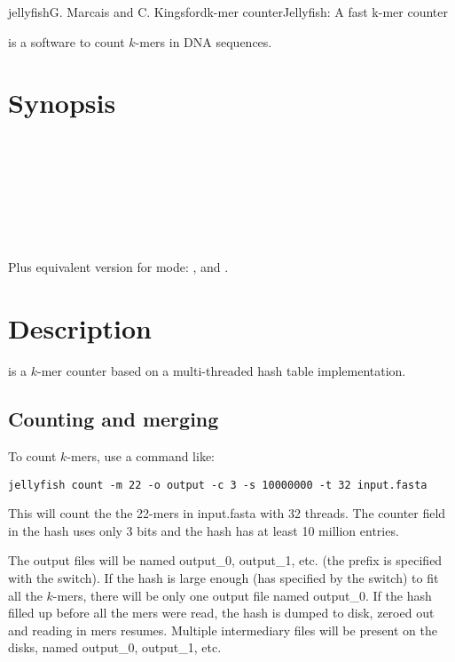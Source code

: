 \documentclass[english]{article}
\newcommand{\ddash}[1]{-\,-#1}
\newcommand{\LoOpt}[1]{\oOpt{\ddash{#1}}}
\begin{document}
\begin{Name}{1}{jellyfish}{G. Marcais and C. Kingsford}{k-mer counter}{Jellyfish: A fast k-mer counter}

 is a software to count $k$-mers in DNA sequences.

\end{Name}

\section{Synopsis}
     \LoOpt{both-strands}   \\
   \Dots \\
   \\
  \\
     \\
  \\
 \\


Plus equivalent version for  mode: ,  and .

\section{Description}

 is a $k$-mer counter based on a multi-threaded hash
table implementation.

\subsection{Counting and merging}

To count $k$-mers, use a command like:

\begin{verbatim}
jellyfish count -m 22 -o output -c 3 -s 10000000 -t 32 input.fasta
\end{verbatim}

This will count the the 22-mers in input.fasta with 32 threads. The
counter field in the hash uses only 3 bits and the hash has at least
10 million entries.

The output files will be named output\_0, output\_1, etc. (the prefix
is specified with the  switch). If the hash is large enough
(has specified by the  switch) to fit all the $k$-mers, there
will be only one output file named output\_0. If the hash filled up
before all the mers were read, the hash is dumped to disk, zeroed out
and reading in mers resumes. Multiple intermediary files will be
present on the disks, named output\_0, output\_1, etc.
\end{document}
